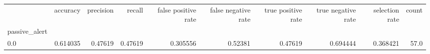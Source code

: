 \begin{tabular}{lrrrrrrrrr}
\toprule
{} &  accuracy &  precision &   recall &  false positive rate &  false negative rate &  true positive rate &  true negative rate &  selection rate &  count \\
passive\_alert &           &            &          &                      &                      &                     &                     &                 &        \\
\midrule
0.0           &  0.614035 &    0.47619 &  0.47619 &             0.305556 &              0.52381 &             0.47619 &            0.694444 &        0.368421 &   57.0 \\
\bottomrule
\end{tabular}
